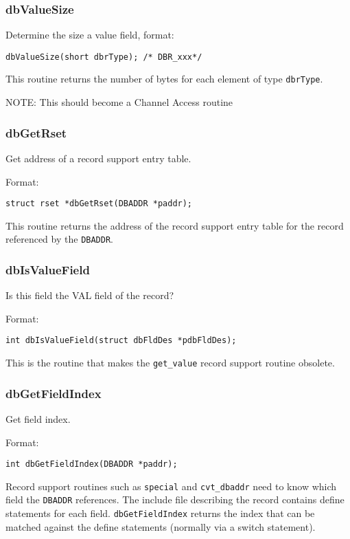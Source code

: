 \subsubsection{dbValueSize}

Determine the size a value field, format:

\begin{verbatim}dbValueSize(short dbrType); /* DBR_xxx*/
\end{verbatim}This routine returns the number of bytes for each element of type \verb|dbrType|.

NOTE: This should become a Channel Access routine

\subsubsection{dbGetRset}

Get address of a record support entry table.

Format:

\begin{verbatim}struct rset *dbGetRset(DBADDR *paddr);
\end{verbatim}This routine returns the address of the record support entry table for the record referenced by the \verb|DBADDR|.

\subsubsection{dbIsValueField}

Is this field the VAL field of the record?

Format:

\begin{verbatim}int dbIsValueField(struct dbFldDes *pdbFldDes);
\end{verbatim}This is the routine that makes the \verb|get_value| record support routine obsolete.

\subsubsection{dbGetFieldIndex}

Get field index.

Format:

\begin{verbatim}int dbGetFieldIndex(DBADDR *paddr);
\end{verbatim}Record support routines such as \verb|special| and \verb|cvt_dbaddr| need to know which field the \verb|DBADDR| references. The 
include file describing the record contains define statements for each field. \verb|dbGetFieldIndex| returns the index that 
can be matched against the define statements (normally via a switch statement).

